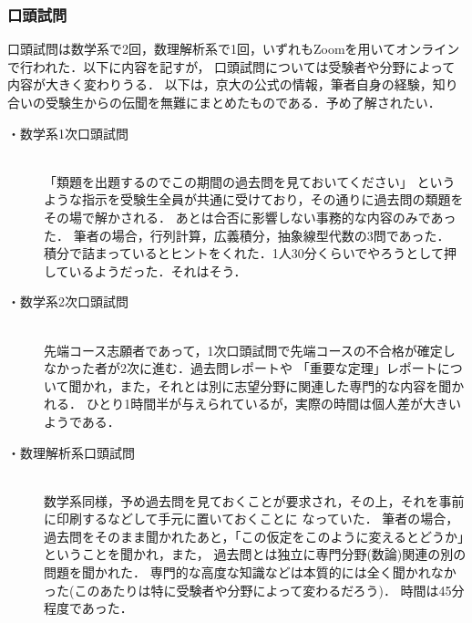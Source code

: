 \documentclass[uplatex]{jsarticle}
\begin{document}
\subsubsection*{口頭試問}
	口頭試問は数学系で2回，数理解析系で1回，いずれもZoomを用いてオンラインで行われた．以下に内容を記すが，
	口頭試問については受験者や分野によって内容が大きく変わりうる．
	以下は，京大の公式の情報，筆者自身の経験，知り合いの受験生からの伝聞を無難にまとめたものである．予め了解されたい．
\begin{description}
	\item[・数学系1次口頭試問]\mbox{}\\
	「類題を出題するのでこの期間の過去問を見ておいてください」
	というような指示を受験生全員が共通に受けており，その通りに過去問の類題をその場で解かされる．
	あとは合否に影響しない事務的な内容のみであった．
	筆者の場合，行列計算，広義積分，抽象線型代数の3問であった．
	積分で詰まっているとヒントをくれた．1人30分くらいでやろうとして押しているようだった．それはそう．
	\item[・数学系2次口頭試問]\mbox{}\\
	先端コース志願者であって，1次口頭試問で先端コースの不合格が確定しなかった者が2次に進む．過去問レポートや
	「重要な定理」レポートについて聞かれ，また，それとは別に志望分野に関連した専門的な内容を聞かれる．
	ひとり1時間半が与えられているが，実際の時間は個人差が大きいようである．
	\item[・数理解析系口頭試問]\mbox{}\\
	数学系同様，予め過去問を見ておくことが要求され，その上，それを事前に印刷するなどして手元に置いておくことに
	なっていた．
	筆者の場合，過去問をそのまま聞かれたあと，「この仮定をこのように変えるとどうか」ということを聞かれ，また，
	過去問とは独立に専門分野(数論)関連の別の問題を聞かれた．
	専門的な高度な知識などは本質的には全く聞かれなかった(このあたりは特に受験者や分野によって変わるだろう)．
	時間は45分程度であった．
\end{description}
\end{document}
